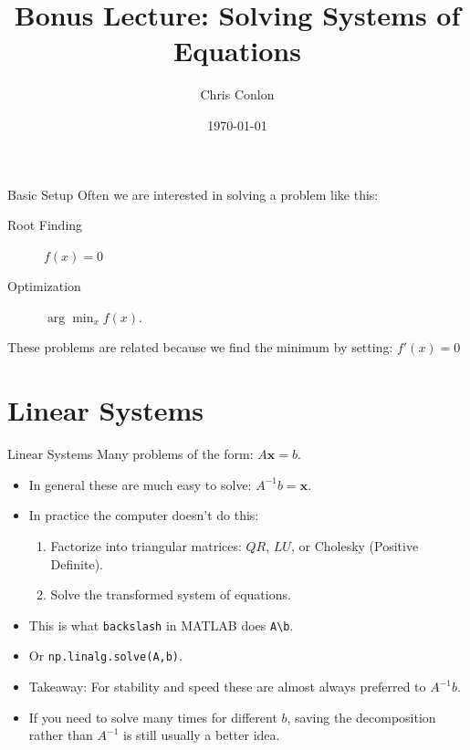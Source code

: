 \documentclass[xcolor=pdftex,dvipsnames,table,mathserif,aspectratio=169]{beamer}
\title{Bonus Lecture: Solving Systems of Equations}
\author{Chris Conlon  }
\institute{Grad IO}
\date{\today }
\begin{document}
\begin{frame}
\titlepage
\end{frame}

\begin{frame}{Basic Setup}
Often we are interested in solving a problem like this:
\begin{description}
\item[Root Finding] $f(x) = 0 $
\item[Optimization] $\arg \min_x f(x)$.
\end{description}
These problems are related because we find the minimum by setting: $f'(x)=0$
\end{frame}


\section{Linear Systems}
\begin{frame}{Linear Systems}
Many problems of the form: $A \mathbf{x} = b$.
\begin{itemize}
\item In general these are much easy to solve: $A^{-1} b = \mathbf{x}$.
\item In practice the computer doesn't do this:
\begin{enumerate}
\item Factorize into triangular matrices: $QR$, $LU$, or Cholesky (Positive Definite).
\item Solve the transformed system of equations.
\end{enumerate}
\item This is what \texttt{backslash} in MATLAB does \texttt{A\textbackslash  b}.
\item Or \texttt{np.linalg.solve(A,b)}.
\item Takeaway: For stability and speed these are almost always preferred to $A^{-1}b$.
\item If you need to solve many times for different $b$, saving the decomposition rather than $A^{-1}$ is still usually a better idea.
\end{itemize}
\end{frame}
\end{document}
